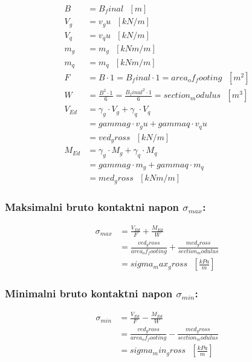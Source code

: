 \documentclass[a4paper, 11pt]{article}
\begin{document}
\begin{align*}
B &= B_final \text{ } [m] \\
V_{g} &= v_gu \text{ } [kN/m] \\
V_{q} &= v_qu \text{ } [kN/m] \\
m_{g} &= m_g \text{ } [kNm/m] \\
m_{q} &= m_q \text{ } [kNm/m] \\
F &= B \cdot 1 = B_final \cdot 1 = area_of_footing \text{ } [m^2] \\
W &= \frac{B^2 \cdot 1}{6} = \frac{B_final ^ 2 \cdot 1}{6} = section_modulus \text{ } [m^3]  \\
V_{Ed} &= \gamma_{g} \cdot V_{g} + \gamma_{q} \cdot V_{q} \\
	   &= gammag \cdot v_gu + gammaq \cdot v_qu \\
	   &= ved_gross \text{ } [kN/m]\\
M_{Ed} &= \gamma_{g} \cdot M_{g} + \gamma_{q} \cdot M_{q} \\
	   &= gammag \cdot m_g + gammaq \cdot m_q \\
	   &= med_gross \text{ } [kNm/m]
\end{align*}

\subsubsection*{Maksimalni bruto kontaktni napon $\sigma_{max}$:}

\begin{align*}
\sigma_{max} &= \frac{V_{Ed}}{F} + \frac{M_{Ed}}{W} \\
             &= \frac{ved_gross}{area_of_footing} + \frac{med_gross}{section_modulus} \\
             &= sigma_max_gross \text{ } [\frac{kPa}{m}]
\end{align*}

\subsubsection*{Minimalni bruto kontaktni napon $\sigma_{min}$:}

\begin{align*}
\sigma_{min} &= \frac{V_{Ed}}{F} - \frac{M_{Ed}}{W} \\
             &= \frac{ved_gross}{area_of_footing} - \frac{med_gross}{section_modulus} \\
             &= sigma_min_gross \text{ } [\frac{kPa}{m}]
\end{align*}
\end{document}
